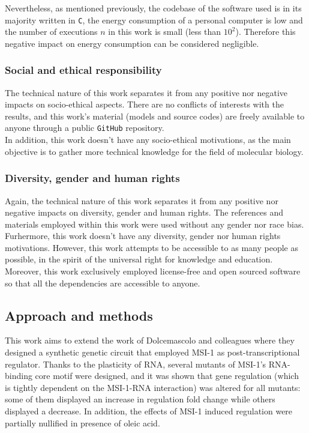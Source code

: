 Nevertheless, as mentioned previously, the codebase of the software used is in its majority written in \texttt{C}, the energy consumption of a personal computer is low and the number of executions $n$ in this work is small (less than $10^2$). Therefore this negative impact on energy consumption can be considered negligible.

\subsubsection{Social and ethical responsibility}

The technical nature of this work separates it from any positive nor negative impacts on socio-ethical aspects. There are no conflicts of interests with the results, and this work's material (models and source codes) are freely available to anyone through a public \texttt{GitHub} repository.\\

In addition, this work doesn't have any socio-ethical motivations, as the main objective is to gather more technical knowledge for the field of molecular biology.


\subsubsection{Diversity, gender and human rights}

Again, the technical nature of this work separates it from any positive nor negative impacts on diversity, gender and human rights. The references and materials employed within this work were used without any gender nor race bias.\\

Furhermore, this work doesn't have any diversity, gender nor human rights motivations. However, this work attempts to be accessible to as many people as possible, in the spirit of the universal right for knowledge and education. Moreover, this work exclusively employed license-free and open sourced software so that all the dependencies are accessible to anyone.

\subsection{Approach and methods}

This work aims to extend the work of Dolcemascolo and colleagues \cite{dolcemascolo_2022} where they designed a synthetic genetic circuit that employed MSI-1 as post-\linebreak transcriptional regulator. Thanks to the plasticity of RNA, several mutants of MSI-1's RNA-binding core motif were designed, and it was shown that gene regulation (which is tightly dependent on the MSI-1-RNA interaction) was altered for all mutants: some of them displayed an increase in regulation fold change while others displayed a decrease. In addition, the effects of MSI-1 induced regulation were partially nullified in presence of oleic acid.\\

